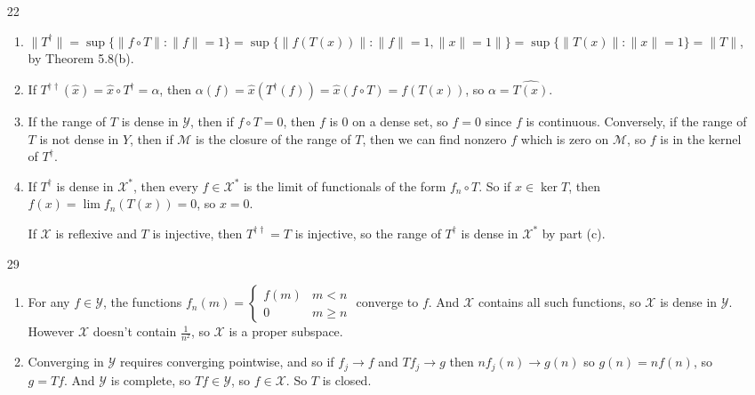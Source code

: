 \documentclass{article}
\newcommand\Y{\mathcal Y}
\newcommand\X{\mathcal X}
\newcommand\M{\mathcal M}
\begin{document}
\begin{enumerate}
\begin{enumerate}
      \end{enumerate}

   \item[22] \begin{enumerate}
         \item $\|T^\dagger\| = \sup \{\|f \circ T\| : \|f\| = 1\} = \sup
            \{\|f(T(x))\| : \|f\| = 1, \|x\| = 1\|\} = \sup \{\|T(x)\| : \|x\| =
            1\} = \|T\|$, by Theorem 5.8(b).

         \item If $T^{\dagger\dagger}(\widehat x) = \widehat x \circ T^\dagger =
            \alpha$, then $\alpha(f) = \widehat x(T^\dagger(f)) = \widehat x(f
            \circ T) = f(T(x))$, so $\alpha = \widehat{T(x)}$.

         \item If the range of $T$ is dense in $\Y$, then if $f \circ T = 0$,
            then $f$ is 0 on a dense set, so $f = 0$ since $f$ is continuous.
            Conversely, if the range of $T$ is not dense in $Y$, then if $\M$ is
            the closure of the range of $T$, then we can find nonzero $f$ which
            is zero on $\M$, so $f$ is in the kernel of $T^\dagger$.

         \item If $T^\dagger$ is dense in $\X^*$, then every $f \in \X^*$ is the
            limit of functionals of the form $f_n \circ T$. So if $x \in \ker
            T$, then $f(x) = \lim f_n(T(x)) = 0$, so $x = 0$.

            If $\X$ is reflexive and $T$ is injective, then $T^{\dagger\dagger}
            = T$ is injective, so the range of $T^\dagger$ is dense in $\X^*$ by
            part (c).
      \end{enumerate}

   \item[29] \begin{enumerate}
         \item For any $f \in \Y$, the functions $f_n(m) =
            \begin{cases}f(m)&m<n\\0&m\geq n\end{cases}$ converge to $f$. And
            $\X$ contains all  such functions, so $\X$ is dense in $\Y$. However
            $\X$ doesn't contain $\frac1{n^2}$, so $\X$ is a proper subspace.

         \item Converging in $\Y$ requires converging pointwise, and so if $f_j
            \to f$ and $Tf_j \to g$ then $nf_j(n) \to g(n)$ so $g(n) = nf(n)$,
            so $g = Tf$. And $\Y$ is complete, so $Tf \in \Y$, so $f \in \X$. So
            $T$ is closed.


\end{enumerate}
\end{enumerate}
\end{document}
